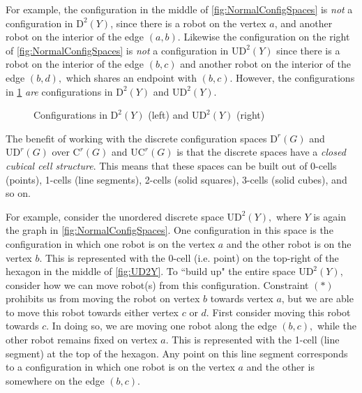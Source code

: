 \documentclass{amsart}
\newcommand{\C}{\mathrm{C}}
\newcommand{\UC}{\mathrm{UC}}
\newcommand{\D}{\mathrm{D}}
\newcommand{\UD}{\mathrm{UD}}
\newcommand{\vertex}[3][1]{
\node [circle,  fill, inner sep = 0pt,outer sep = 0pt, minimum size=#1mm] (#3) at #2 {};
}
\newcommand{\fg}[1]{
    \pgfdeclarelayer{foreground}
    \pgfsetlayers{main,foreground}
    \begin{pgfonlayer}{foreground}
    #1
    \end{pgfonlayer}
    }
\newcommand{\Ygraph}{
    \fg{\vertex{(0,0)}{B}
    \vertex{(0,-1)}{A}
    \vertex{(-.707,.707)}{C}
    \vertex{(.707,.707)}{D}
    \draw (A) -- (B) -- (C) -- (B) -- (D);
    }
}
\newcommand{\RedRobot}[2]{
\node [rectangle, cbred, fill, inner sep = 0pt,outer sep = 1pt, minimum size=2.3mm] (#2) at #1 {};
}
\newcommand{\GreenRobot}[2]{
\node [diamond, cbgreen, fill, inner sep = 0pt,outer sep = 1pt,minimum size=3mm] (#2) at #1 {};
}
\newcommand{\GrayRobot}[2]{
\node [circle, Gray, fill, inner sep = 0pt,outer sep = 1pt, minimum size=2.5mm] (#2) at #1 {};
}
\theoremstyle{definition}
\theoremstyle{remark}
\begin{document}
For example, the configuration in the middle of \cref{fig:NormalConfigSpaces} is \textit{not} a configuration in $\D^2(Y)$, since there is a robot on the vertex $a$, and another robot on the interior of the edge $(a,b)$. Likewise the configuration on the right of \cref{fig:NormalConfigSpaces} is \textit{not} a configuration in $\UD^2(Y)$ since there is a robot on the interior of the edge $(b,c)$ and another robot on the interior of the edge $(b,d),$ which shares an endpoint with $(b,c).$ However, the configurations in \cref{fig:DiscreteConfigSpaces} \textit{are}  configurations in $\D^2(Y)$ and $\UD^2(Y)$. 

\begin{figure}[h!]
    \centering
    \hspace{1cm}
    \caption{Configurations in $\D^2(Y)$ (left) and $\UD^2(Y)$ (right)}
    \label{fig:DiscreteConfigSpaces}
\end{figure}

The benefit of working with the discrete configuration spaces $\D^r(G)$ and $\UD^r(G)$ over $\C^r(G)$ and $\UC^r(G)$ is that the discrete spaces have a \textit{closed cubical cell structure}. This means that these spaces can be built out of 0-cells (points), 1-cells (line segments), 2-cells (solid squares), 3-cells (solid cubes), and so on. 

For example, consider the unordered discrete space $\UD^2(Y),$ where $Y$ is again the graph in \cref{fig:NormalConfigSpaces}. One configuration in this space is the configuration in which one robot is on the vertex $a$ and the other robot is on the vertex $b.$ This is represented with the 0-cell (i.e. point) on the top-right of the hexagon in the middle of \cref{fig:UD2Y}. To ``build up" the entire space $\UD^2(Y),$ consider how we can move robot(s) from this configuration. Constraint $(\ast)$ prohibits us from moving the robot on vertex $b$ towards vertex $a$, but we are able to move this robot towards either vertex $c$ or $d.$ First consider moving this robot towards $c$. In doing so, we are moving one robot along the edge $(b,c),$ while the other robot remains fixed on vertex $a.$ This is represented with the 1-cell (line segment) at the top of the hexagon. Any point on this line segment corresponds to a configuration in which one robot is on the vertex $a$ and the other is somewhere on the edge $(b,c)$.
\end{document}
